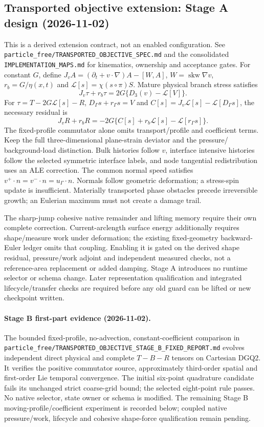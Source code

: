 \documentclass[11pt]{article}
\begin{document}
\subsection{Transported objective extension: Stage A design (2026-11-02)}
This is a derived extension contract, not an enabled configuration. See
\texttt{particle\_free/TRANSPORTED\_OBJECTIVE\_SPEC.md} and the consolidated
\texttt{IMPLEMENTATION\_MAPS.md} for kinematics, ownership and acceptance gates.
For constant $G$, define $J_v A=(\partial_t+v\cdot\nabla)A-[W,A]$,
$W=\operatorname{skw}\nabla v$, $r_b=G/\eta(x,t)$ and
$\mathcal L[s]=\chi(s\circ\pi)S$. Mature physical branch stress satisfies
\[
 J_v\tau+r_b\tau=2G\{D_3(v)-\mathcal L[V]\}.
\]
For $\tau=T-2G\mathcal L[s]-R$,
$D_\Gamma s+r_\Gamma s=V$ and
$C[s]=J_v\mathcal L[s]-\mathcal L[D_\Gamma s]$, the necessary residual is
\[
 J_vR+r_bR=-2G\{C[s]+r_b\mathcal L[s]-\mathcal L[r_\Gamma s]\}.
\]
The fixed-profile commutator alone omits transport/profile and coefficient
terms. Keep the full three-dimensional plane-strain deviator and the pressure/
background-load distinction. Bulk histories follow $v$, interface intensive
histories follow the selected symmetric interface labels, and node tangential
redistribution uses an ALE correction. The common normal speed satisfies
$v^+\cdot n=v^-\cdot n=u_\Gamma\cdot n$. Normals follow geometric deformation;
a stress-spin update is insufficient. Materially transported phase obstacles
precede irreversible growth; an Eulerian maximum must not create a damage trail.

The sharp-jump cohesive native remainder and lifting memory require their own
complete correction. Current-arclength surface energy additionally requires
shape/measure work under deformation; the existing fixed-geometry backward-Euler
ledger omits that coupling. Enabling it is gated on the derived shape residual,
pressure/work adjoint and independent measured checks, not a reference-area
replacement or added damping. Stage A introduces no runtime selector or schema
change. Later representation qualification and integrated lifecycle/transfer
checks are required before any old guard can be lifted or new checkpoint written.


\paragraph{Stage B first-part evidence (2026-11-02).}
The bounded fixed-profile, no-advection, constant-coefficient comparison in
\texttt{particle\_free/TRANSPORTED\_OBJECTIVE\_STAGE\_B\_FIXED\_REPORT.md}
evolves independent direct physical and complete $T-B-R$ tensors on Cartesian
DGQ2. It verifies the positive commutator source, approximately third-order
spatial and first-order Lie temporal convergence. The initial six-point
quadrature candidate fails its unchanged strict coarse-grid bound; the selected
eight-point rule passes. No native selector, state owner or schema is modified.
The remaining Stage B moving-profile/coefficient experiment is recorded below;
coupled native pressure/work, lifecycle and cohesive shape-force qualification
remain pending.
\end{document}
